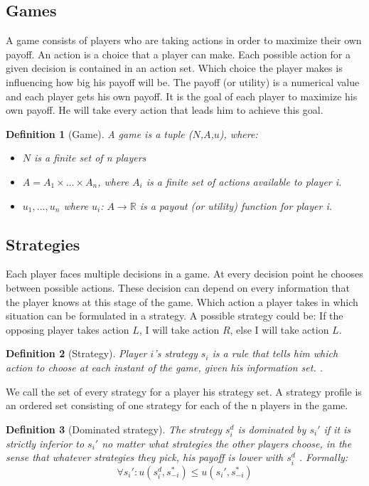\documentclass{cacthesis}
\newtheorem{definition}{Definition}
\begin{document}
\subsection{Games}
A game consists of players who are taking actions in order to maximize their own payoff. An action is a choice that a player can make. Each possible action for a given decision is contained in an action set. Which choice the player makes is influencing how big his payoff will be. The payoff (or utility) is a numerical value and each player gets his own payoff. It is the goal of each player to maximize his own payoff. He will take every action that leads him to achieve this goal.
\begin{definition}[Game]
A game is a tuple ($N$,$A$,$u$), where:
\begin{itemize}
    \item $N$ is a finite set of n players
    \item $A = A_1 \times \dots \times A_n$, where $A_i$ is a finite set of actions available to player i. %
    \item $u_1,...,u_n$ where $u_i$: $A \to \mathbb{R}$ is a payout (or utility) function for player i.
\end{itemize} {\normalfont \cite{leyton-brown_essentials_2008}}
\end{definition}
\subsection{Strategies}
Each player faces multiple decisions in a game. At every decision point he chooses between possible actions. These decision can depend on every information that the player knows at this stage of the game. Which action a player takes in which situation can be formulated in a strategy. A possible strategy could be: If the opposing player takes action $L$, I will take action $R$, else I will take action $L$.\newline

\begin{definition}[Strategy]
Player $i$'s strategy $s_i$ is a rule that tells him which action to choose at each instant of the game, given his information set. {\normalfont \cite{rasmusen_games_nodate}}.
\end{definition}
We call the set of every strategy for a player his strategy set. A strategy profile is an ordered set consisting of one strategy for each of the n players in the game.
\begin{definition}[Dominated strategy]
The strategy $s^d_i$ is dominated by $s_i'$ if it is strictly inferior to $s_i'$ no matter what strategies the other players choose, in the sense that whatever strategies they pick, his payoff is lower with $s^d_i$ {\normalfont \cite{rasmusen_games_nodate}}. Formally: 
\begin{equation}
    \forall s_i': u(s^d_i,s^*_{-i}) \leq u(s_i',s^*_{-i})
\end{equation}
\end{definition}
\end{document}
